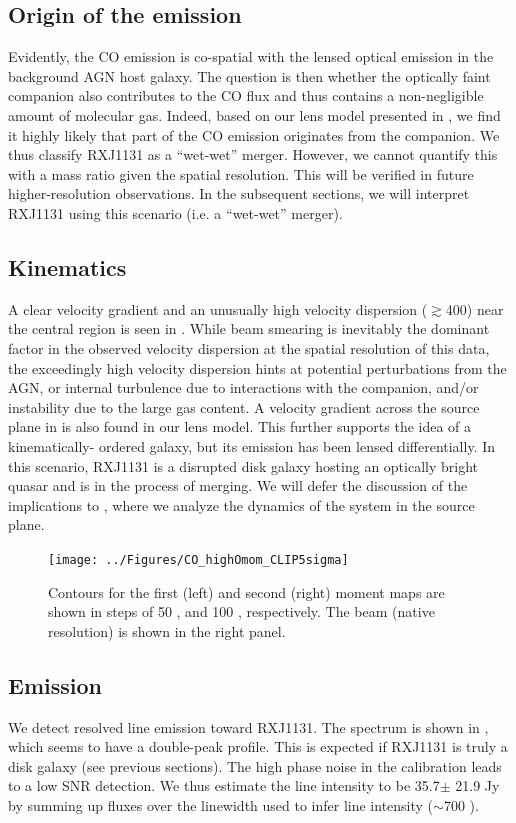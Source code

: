 \documentclass[]{emulateapj}
\begin{document}
\subsection{Origin of the \bco emission} \label{sec:origin} %
Evidently, the CO emission is co-spatial with the lensed optical emission in
the background AGN host galaxy. The question is then whether the optically
faint companion also contributes to the CO flux and thus contains a
non-negligible amount of molecular gas.
Indeed, based on our lens model presented in , we find it
highly likely that part of the CO emission originates from
the companion. We thus classify RXJ1131 as a ``wet-wet'' merger.
However, we cannot quantify this with a mass ratio given the
spatial resolution. This will be verified in future higher-resolution observations. In the subsequent sections, we will interpret RXJ1131
using this scenario (i.e. a ``wet-wet'' merger).

\subsection{\bco Kinematics} %
A clear velocity gradient and an unusually high
velocity dispersion ($\gtrsim$400\kms) near the central region
is seen in . While beam smearing is inevitably the
dominant factor in the observed velocity dispersion
at the spatial resolution of this data, the exceedingly
high velocity dispersion hints
at potential perturbations from the AGN, or internal turbulence due to
interactions with the companion, and/or instability due to the large gas
content. A velocity gradient across the source plane in  is also
found in our lens model. This further supports the idea of a kinematically-
ordered galaxy, but its emission has been lensed differentially.
In this scenario, RXJ1131 is a disrupted disk galaxy hosting an optically
bright quasar and is in the process of merging.
We will defer the discussion of the implications to ,
where we analyze the dynamics of the system in the source plane.

\begin{figure}[!htbp]
\centering
\texttt{[image: ../Figures/CO\_highOmom\_CLIP5sigma]}
\caption{
Contours for the first (left) and second (right) moment maps are shown in steps of 
50 \kms, and 100 \kms, respectively. The beam (native resolution) is shown in the right panel.
\label{fig:CO21highO}}
\end{figure}


\subsection{\cco Emission} %
We detect resolved \cco line emission toward RXJ1131. The spectrum is shown in
, which seems to have a double-peak profile.
This is expected if RXJ1131 is truly a disk galaxy (see previous
sections). The high phase noise in the calibration leads to a low SNR
detection. We thus estimate the line intensity to be
35.7$\pm$ 21.9 Jy\,\kms by summing up fluxes over the
linewidth used to infer \bco line intensity ($\sim$700 \kms).
\end{document}
